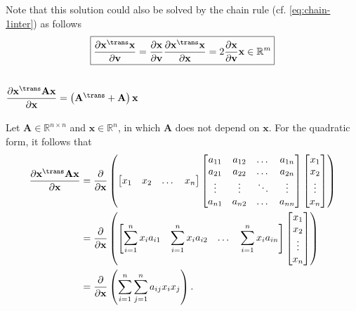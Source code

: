 Note that this solution could also be solved by the chain rule (cf. \eqref{eq:chain-1inter}) as follows
\begin{align}
    \boxed{\dfrac{\partial \mathbf{x}^\trans \mathbf{x}}{\partial \mathbf{v}} = \dfrac{\partial \mathbf{x}}{\partial \mathbf{v}} \dfrac{\partial \mathbf{x}^\trans \mathbf{x}}{\partial \mathbf{x}} = 2\dfrac{\partial \mathbf{x}}{\partial \mathbf{v}}\mathbf{x} \in \mathbb{R}^m}
\end{align}

\subsection{\(\dfrac{\partial \mathbf{x}^\trans \mathbf{A} \mathbf{x}}{\partial \mathbf{x}} = \left(\mathbf{A}^\trans + \mathbf{A}\right) \mathbf{x}\)}
Let \(\mathbf{A}\in \mathbb{R}^{n\times n}\) and \(\mathbf{x} \in \mathbb{R}^{n}\), in which \(\mathbf{A}\) does not depend on \(\mathbf{x}\). For the quadratic form, it follows that
\begin{align}
    \dfrac{\partial \mathbf{x}^\trans \mathbf{A} \mathbf{x}}{\partial \mathbf{x}} &= \dfrac{\partial}{\partial \mathbf{x}} \left(
    \begin{bmatrix}
        x_{1} & x_{2} & \dots & x_{n}
    \end{bmatrix}
    \begin{bmatrix}
        a_{11} & a_{12} & \dots & a_{1n} \\
        a_{21} & a_{22} & \dots & a_{2n} \\
        \vdots & \vdots & \ddots & \vdots \\
        a_{n1} & a_{n2} & \dots & a_{nn} \\
    \end{bmatrix} \begin{bmatrix}
        x_{1} \\ x_{2} \\ \vdots \\ x_{n}
    \end{bmatrix} \right) \\
    &= \dfrac{\partial}{\partial \mathbf{x}} \left(
			\begin{bmatrix}
				\displaystyle \sum_{i = 1}^{n} x_{i}a_{i1} & 
				\displaystyle \sum_{i = 1}^{n} x_{i}a_{i2} & 
				\dots & 
				\displaystyle \sum_{i = 1}^{n} x_{i}a_{in}
			\end{bmatrix} \begin{bmatrix}
				x_{1} \\ x_{2} \\ \vdots \\ x_{n}
			\end{bmatrix} \right) \\
            &= \dfrac{\partial}{\partial \mathbf{x}} \left(
				\sum_{i = 1}^{n}\sum_{j = 1}^{n} a_{ij} x_{i} x_{j}
			\right).
\end{align}


